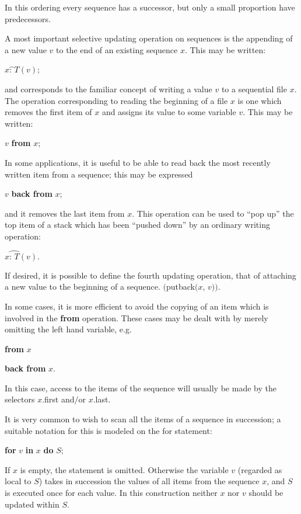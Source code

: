 \noindent
In this ordering every sequence has a successor, but only a small proportion have predecessors.

A most important selective updating operation on sequences is the appending of a new value $v$ to the end of an existing sequence $x$. This may be written:


\quad $x\wideparen{\text{: \ } }T(v)$;

\noindent
and corresponds to the familiar concept of writing a value $v$ to a sequential file $x$. The operation corresponding to reading the beginning of a file $x$ is one which removes the first item of $x$ and assigns its value to some variable $v$. This may be written:

\quad $v$ \textbf{from} $x$;

\noindent
In some applications, it is useful to be able to read back the most recently written item from a sequence; this may be expressed

\quad $v$ \textbf{back from} $x$;

\noindent
and it removes the last item from $x$. This operation can be used to ``pop up'' the top item of a stack which has been ``pushed down'' by an ordinary writing operation:

\quad $x\wideparen{\text{: } T}(v).$

\noindent
If desired, it is possible to define the fourth updating operation, that of attaching a new value to the beginning of a sequence. $($putback$(x$, $v))$.

In some cases, it is more efficient to avoid the copying of an item which is involved in the \textbf{from} operation. These cases may be dealt with by merely omitting the left hand variable, e.g.

\quad \textbf{from} $x$

\quad \textbf{back from} $x$.

\noindent
In this case, access to the items of the sequence will usually be made by the selectors $x$.first and$/$or $x$.last.

It is very common to wish to scan all the items of a sequence in succession; a suitable notation for this is modeled on the for statement:

\quad \textbf{for} $v$ \textbf{in} $x$ \textbf{do} $S$;

\noindent
If $x$ is empty, the statement is omitted. Otherwise the variable $v$ (regarded as local to $S$) takes in succession the values of all items from the sequence $x$, and $S$ is executed once for each value. In this construction neither $x$ nor $v$ should be updated within $S$.

